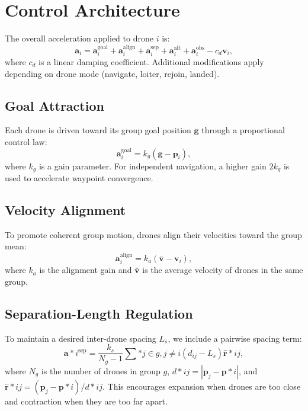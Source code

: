 \documentclass[12pt]{article}
\begin{document}
\section{Control Architecture}
The overall acceleration applied to drone $i$ is:
\begin{equation}
\mathbf{a}_i = \mathbf{a}_i^{\mathrm{goal}} + \mathbf{a}_i^{\mathrm{align}} + \mathbf{a}_i^{\mathrm{sep}} + \mathbf{a}_i^{\mathrm{alt}} + \mathbf{a}_i^{\mathrm{obs}} - c_d \mathbf{v}_i,
\end{equation}
where $c_d$ is a linear damping coefficient. Additional modifications apply depending on drone mode (navigate, loiter, rejoin, landed).

\subsection{Goal Attraction}
Each drone is driven toward its group goal position $\mathbf{g}$ through a proportional control law:
\begin{equation}
\mathbf{a}_i^{\mathrm{goal}} = k_g (\mathbf{g} - \mathbf{p}_i),
\end{equation}
where $k_g$ is a gain parameter. For independent navigation, a higher gain $2k_g$ is used to accelerate waypoint convergence.

\subsection{Velocity Alignment}
To promote coherent group motion, drones align their velocities toward the group mean:
\begin{equation}
\mathbf{a}_i^{\mathrm{align}} = k_a (\bar{\mathbf{v}} - \mathbf{v}_i),
\end{equation}
where $k_a$ is the alignment gain and $\bar{\mathbf{v}}$ is the average velocity of drones in the same group.

\subsection{Separation-Length Regulation}
To maintain a desired inter-drone spacing $L_s$, we include a pairwise spacing term:
\begin{equation}
\mathbf{a}*i^{\mathrm{sep}} = \frac{k_s}{N_g - 1} \sum*{j \in g, j \neq i} (d_{ij} - L_s) \hat{\mathbf{r}}*{ij},
\end{equation}
where $N_g$ is the number of drones in group $g$, $d*{ij} = |\mathbf{p}_j - \mathbf{p}*i|$, and $\hat{\mathbf{r}}*{ij} = (\mathbf{p}_j - \mathbf{p}*i)/d*{ij}$. This encourages expansion when drones are too close and contraction when they are too far apart.
\end{document}
